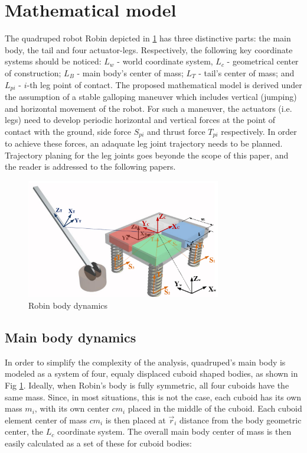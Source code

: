 \section{Mathematical model}\label{sec:MathModel}
The quadruped robot Robin depicted in \ref{fig:rmoment} has three distinctive parts: the main body, the tail and four actuator-legs. Respectively, the following key coordinate systems should be noticed: $L_w$ - world coordinate system, $L_c$ - geometrical center of construction; $L_B$ - main body's center of mass; $L_T$ - tail's center of mass; and $L_{pi}$ - $i$-th leg point of contact. The proposed mathematical model is derived under the assumption of a stable galloping maneuver which includes vertical (jumping) and horizontal movement of the robot. For such a maneuver, the actuators (i.e. legs) need to develop periodic horizontal and vertical forces at the point of contact with the ground, side force $S_{pi}$ and thrust force $T_{pi}$ respectively. In order to achieve these forces, an adaquate leg joint trajectory needs to be planned. Trajectory planing for the leg joints goes beyonde the scope of this paper, and the reader is addressed to the following papers. 

\begin{figure}
	\centering
	\includegraphics[width=85mm]{./pictures/RobinMoment.pdf}
	\caption{Robin body dynamics}
	\label{fig:rmoment}
\end{figure}

\subsection{Main body dynamics}
In order to simplify the complexity of the analysis, quadruped's main body is modeled as a system of four, equaly displaced cuboid shaped bodies, as shown in Fig \ref{fig:rmoment}. Ideally, when Robin's body is fully symmetric, all four cuboids have the same mass. Since, in most situations, this is not the case, each cuboid has its own mass $m_i$, with its own center $cm_i$ placed in the middle of the cuboid. Each cuboid element center of mass $cm_i$ is then placed at $\vec{r}_i$ distance from the body geometric center, the $L_c$ coordinate system. The overall main body center of mass is then easily calculated as a set of these for cuboid bodies:
 
